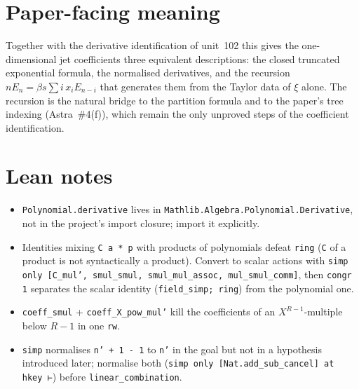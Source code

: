 \documentclass[11pt]{article}
\begin{document}
\section{Paper-facing meaning}

Together with the derivative identification of unit~102 this gives the one-dimensional jet
coefficients three equivalent descriptions: the closed truncated exponential formula, the normalised
derivatives, and the recursion $nE_n=\beta s\sum i\,x_iE_{n-i}$ that generates them from the Taylor
data of $\xi$ alone. The recursion is the natural bridge to the partition formula and to the
paper's tree indexing (Astra~\#4(f)), which remain the only unproved steps of the coefficient
identification.

\section{Lean notes}

\begin{itemize}
\item \texttt{Polynomial.derivative} lives in \texttt{Mathlib.Algebra.Polynomial.Derivative}, not in
the project's import closure; import it explicitly.
\item Identities mixing \texttt{C a * p} with products of polynomials defeat \texttt{ring}
(\texttt{C} of a product is not syntactically a product). Convert to scalar actions with
\texttt{simp only [C\_mul', smul\_smul, smul\_mul\_assoc, mul\_smul\_comm]}, then \texttt{congr 1}
separates the scalar identity (\texttt{field\_simp; ring}) from the polynomial one.
\item \texttt{coeff\_smul} + \texttt{coeff\_X\_pow\_mul'} kill the coefficients of an $X^{R-1}$-multiple
below $R-1$ in one \texttt{rw}.
\item \texttt{simp} normalises \texttt{n' + 1 - 1} to \texttt{n'} in the goal but not in a
hypothesis introduced later; normalise both (\texttt{simp only [Nat.add\_sub\_cancel] at hkey ⊢})
before \texttt{linear\_combination}.
\end{itemize}
\end{document}
